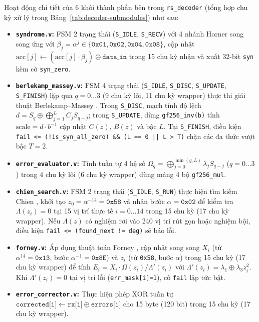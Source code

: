 \documentclass[11pt,a4paper]{report}
\begin{document}
Hoạt động chi tiết của 6 khối thành phần bên trong \texttt{rs\_decoder} (tổng hợp chu kỳ xử lý trong Bảng~\ref{tab:decoder-submodules}) như sau:
\begin{itemize}
    \item \textbf{\texttt{syndrome.v}:} FSM 2 trạng thái (\texttt{S\_IDLE}, \texttt{S\_RECV}) với 4 nhánh Horner song song ứng với $\beta_j = \alpha^j \in \{\texttt{0x01}, \texttt{0x02}, \texttt{0x04}, \texttt{0x08}\}$, cập nhật $\text{acc}[j] \leftarrow (\text{acc}[j]\cdot \beta_j) \oplus \texttt{data\_in}$ trong 15 chu kỳ nhận và xuất 32-bit \texttt{syn} kèm cờ \texttt{syn\_zero}.
    \item \textbf{\texttt{berlekamp\_massey.v}:} FSM 4 trạng thái (\texttt{S\_IDLE}, \texttt{S\_DISC}, \texttt{S\_UPDATE}, \texttt{S\_FINISH}) lặp qua $q=0\dots 3$ (9 chu kỳ lõi, 11 chu kỳ wrapper) thực thi giải thuật Berlekamp--Massey \cite{berlekamp1968,massey1969}. Trong \texttt{S\_DISC}, mạch tính độ lệch $d = S_q \oplus \bigoplus_{j=1}^L C_j S_{q-j}$; trong \texttt{S\_UPDATE}, dùng \texttt{gf256\_inv(b)} tính $\text{scale} = d \cdot b^{-1}$ cập nhật $C(z)$, $B(z)$ và bậc $L$. Tại \texttt{S\_FINISH}, điều kiện \texttt{fail <= (!is\_syn\_all\_zero) \&\& (L == 0 || L > T)} chặn các đa thức vượt bậc $T=2$.
    \item \textbf{\texttt{error\_evaluator.v}:} Tính tuần tự 4 hệ số $\Omega_q = \bigoplus_{j=0}^{\min(q,L)} \lambda_j S_{q-j}$ ($q=0\dots 3$) trong 4 chu kỳ lõi (6 chu kỳ wrapper) dùng mảng 4 bộ \texttt{gf256\_mul}.
    \item \textbf{\texttt{chien\_search.v}:} FSM 2 trạng thái (\texttt{S\_IDLE}, \texttt{S\_RUN}) thực hiện tìm kiếm Chien \cite{chien1964}, khởi tạo $z_0 = \alpha^{-14} = \texttt{0x58}$ và nhân bước $\alpha = \texttt{0x02}$ để kiểm tra $\Lambda(z_i)=0$ tại 15 vị trí thực tế $i=0\dots 14$ trong 15 chu kỳ (17 chu kỳ wrapper). Nếu $\Lambda(z)$ có nghiệm rơi vào 240 vị trí rút gọn hoặc nghiệm bội, điều kiện \texttt{fail <= (found\_next != deg)} sẽ báo lỗi.
    \item \textbf{\texttt{forney.v}:} Áp dụng thuật toán Forney \cite{forney1965}, cập nhật song song $X_i$ (từ $\alpha^{14} = \texttt{0x13}$, bước $\alpha^{-1}=\texttt{0x8E}$) và $z_i$ (từ \texttt{0x58}, bước $\alpha$) trong 15 chu kỳ (17 chu kỳ wrapper) để tính $E_i = X_i \cdot \Omega(z_i)/\Lambda'(z_i)$ với $\Lambda'(z_i) = \lambda_1 \oplus \lambda_3 z_i^2$. Khi $\Lambda'(z_i)=0$ tại vị trí lỗi (\texttt{err\_mask[i]=1}), cờ \texttt{fail} lập tức bật.
    \item \textbf{\texttt{error\_corrector.v}:} Thực hiện phép XOR tuần tự $\texttt{corrected[i]} \leftarrow \texttt{rx[i]} \oplus \texttt{errors[i]}$ cho 15 byte (120 bit) trong 15 chu kỳ (17 chu kỳ wrapper).
\end{itemize}
\end{document}
